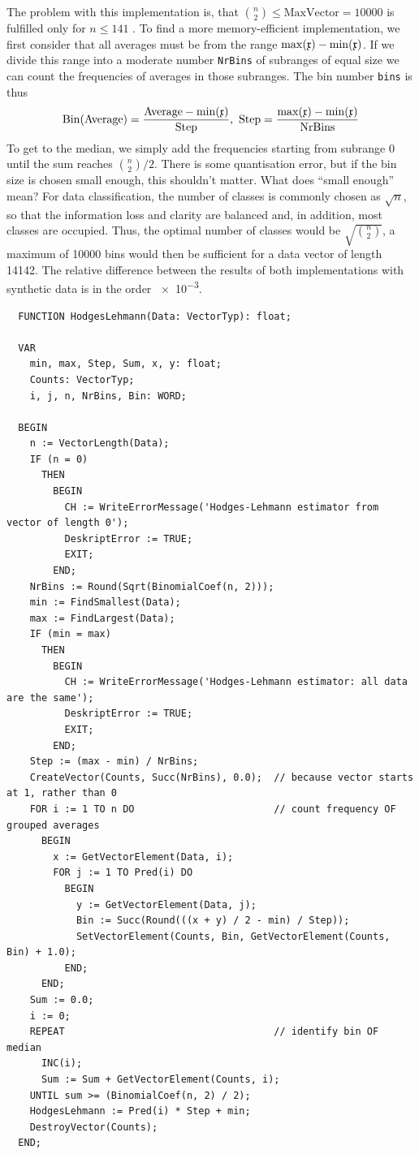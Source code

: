 \begin{refsection}
The problem with this implementation is, that \( \binom{n}{2} \leq \mathrm{MaxVector} = \num{10000} \) is fulfilled only for \( n \leq \num{141} \) . %
To find a more memory-efficient implementation, we first consider that all averages must be from the range \( \max(\mathfrak{x}) - \min(\mathfrak{x}) \). If we divide this range into a moderate number \texttt{NrBins} of subranges of equal size we can count the frequencies of averages in those subranges. The bin number \texttt{bins} is thus
\begin{equation}
  \mathrm{Bin}(\mathrm{Average}) = \frac{\mathrm{Average} - \min(\AbsVec{x})}{\mathrm{Step}},\ \mathrm{Step} = \frac{\max(\AbsVec{x}) - \min(\AbsVec{x})}{\mathrm{NrBins}}
\end{equation}
To get to the median, we simply add the frequencies starting from subrange 0 until the sum reaches \( \binom{n}{2} / 2 \). There is some quantisation error, but if the bin size is chosen small enough, this shouldn't matter. What does ``small enough'' mean? For data classification, the number of classes is commonly chosen as \( \sqrt{n} \), so that the information loss and clarity are balanced and, in addition, most classes are occupied. Thus, the optimal number of classes would be \( \sqrt{\binom{n}{2}} \), a maximum of \num{10000} bins would then be sufficient for a data vector of length \num{14142}. The relative difference between the results of both implementations with synthetic data is in the order \num{e-3}.

\begin{lstlisting}
  FUNCTION HodgesLehmann(Data: VectorTyp): float;

  VAR
    min, max, Step, Sum, x, y: float;
    Counts: VectorTyp;
    i, j, n, NrBins, Bin: WORD;

  BEGIN
    n := VectorLength(Data);
    IF (n = 0)
      THEN
        BEGIN
          CH := WriteErrorMessage('Hodges-Lehmann estimator from vector of length 0');
          DeskriptError := TRUE;
          EXIT;
        END;
    NrBins := Round(Sqrt(BinomialCoef(n, 2)));
    min := FindSmallest(Data);
    max := FindLargest(Data);
    IF (min = max)
      THEN
        BEGIN
          CH := WriteErrorMessage('Hodges-Lehmann estimator: all data are the same');
          DeskriptError := TRUE;
          EXIT;
        END;
    Step := (max - min) / NrBins;
    CreateVector(Counts, Succ(NrBins), 0.0);  // because vector starts at 1, rather than 0
    FOR i := 1 TO n DO                        // count frequency OF grouped averages
      BEGIN
        x := GetVectorElement(Data, i);
        FOR j := 1 TO Pred(i) DO
          BEGIN
            y := GetVectorElement(Data, j);
            Bin := Succ(Round(((x + y) / 2 - min) / Step));
            SetVectorElement(Counts, Bin, GetVectorElement(Counts, Bin) + 1.0);
          END;
      END;
    Sum := 0.0;
    i := 0;
    REPEAT                                    // identify bin OF median
      INC(i);
      Sum := Sum + GetVectorElement(Counts, i);
    UNTIL sum >= (BinomialCoef(n, 2) / 2);
    HodgesLehmann := Pred(i) * Step + min;
    DestroyVector(Counts);
  END;
\end{lstlisting}


\end{refsection}
